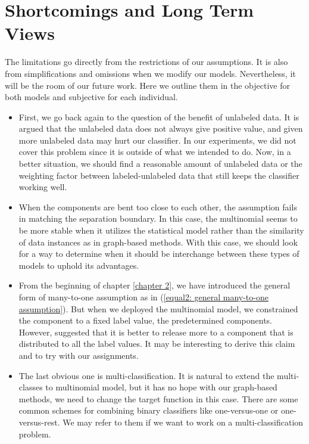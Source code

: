 \section{Shortcomings and Long Term Views}
The limitations go directly from the restrictions of our assumptions. It is also from simplifications and omissions when we modify our models. Nevertheless, it will be the room of our future work. Here we outline them in the objective for both models and subjective for each individual.

\begin{itemize}
	\item First, we go back again to the question of the benefit of unlabeled data. It is argued that the unlabeled data does not always give positive value, and given more unlabeled data may hurt our classifier. In our experiments, we did not cover this problem since it is outside of what we intended to do. Now, in a better situation, we should find a reasonable amount of unlabeled data or the weighting factor between labeled-unlabeled data that still keeps the classifier working well.
	
 	\item When the components are bent too close to each other, the assumption fails in matching the separation boundary. In this case, the multinomial seems to be more stable when it utilizes the statistical model rather than the similarity of data instances as in graph-based methods. With this case, we should look for a way to determine when it should be interchange between these types of models to uphold its advantages.
	
	\item From the beginning of chapter \ref{chapter 2}, we have introduced the general form of many-to-one assumption as in (\ref{equal2: general many-to-one assumption}). But when we deployed the multinomial model, we constrained the component to a fixed label value, the predetermined components. However, \citeauthor{NIPS1996_1208} \parencite{NIPS1996_1208} suggested that it is better to release more to a component that is distributed to all the label values. It may be interesting to derive this claim and to try with our assignments.
	
	\item The last obvious one is multi-classification. It is natural to extend the multi-classes to multinomial model, but it has no hope with our graph-based methods, we need to change the target function in this case. There are some common schemes for combining binary classifiers like one-versus-one or one-versus-rest. We may refer to them if we want to work on a multi-classification problem.
\end{itemize}

